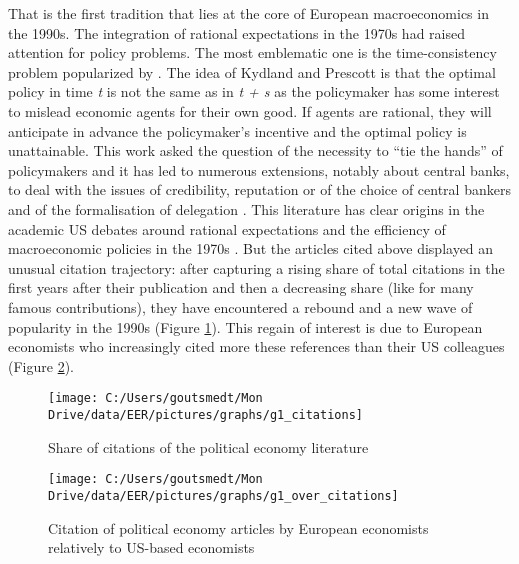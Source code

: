 \documentclass[]{elsarticle} %
\begin{document}
That is the first tradition that lies at the core of European
macroeconomics in the 1990s. The integration of rational expectations in
the 1970s had raised attention for policy problems. The most emblematic
one is the time-consistency problem popularized by \citep{kydland1977}.
The idea of Kydland and Prescott is that the optimal policy in time
\emph{t} is not the same as in \emph{t + s} as the policymaker has some
interest to mislead economic agents for their own good. If agents are
rational, they will anticipate in advance the policymaker's incentive
and the optimal policy is unattainable. This work asked the question of
the necessity to ``tie the hands'' of policymakers and it has led to
numerous extensions, notably about central banks, to deal with the
issues of credibility, reputation \citep{barro1983, barro1983c} or of
the choice of central bankers and of the formalisation of delegation
\citep{rogoff1985b}. This literature has clear origins in the academic
US debates around rational expectations and the efficiency of
macroeconomic policies in the 1970s \citep[80-86]{hoover1988}. But the
articles cited above displayed an unusual citation trajectory: after
capturing a rising share of total citations in the first years after
their publication and then a decreasing share (like for many famous
contributions), they have encountered a rebound and a new wave of
popularity in the 1990s (Figure \ref{fig:plot-political-economy}). This
regain of interest is due to European economists who increasingly cited
more these references than their US colleagues (Figure
\ref{fig:plot-political-economy-europe}).

\begin{figure}[h]

{\centering \texttt{[image: C:/Users/goutsmedt/Mon Drive/data/EER/pictures/graphs/g1\_citations]} 

}

\caption{Share of citations of the political economy literature}\label{fig:plot-political-economy}
\end{figure}

\begin{figure}[h]

{\centering \texttt{[image: C:/Users/goutsmedt/Mon Drive/data/EER/pictures/graphs/g1\_over\_citations]} 

}

\caption{Citation of political economy articles by European economists relatively to US-based economists}\label{fig:plot-political-economy-europe}
\end{figure}
\end{document}
